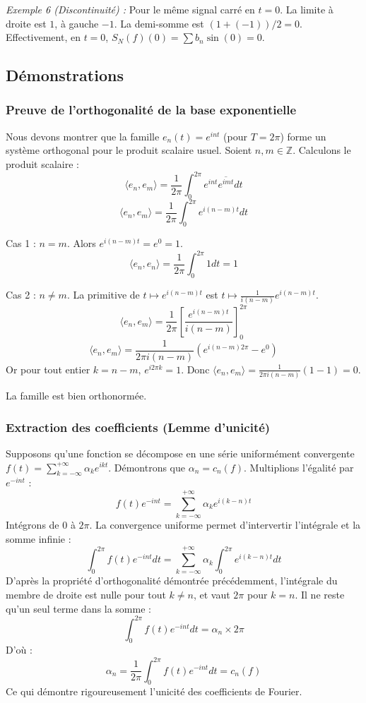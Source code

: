 \documentclass[11pt,a4paper]{article}
\begin{document}
\textit{Exemple 6 (Discontinuité) :}
Pour le même signal carré en $t = 0$. La limite à droite est $1$, à gauche $-1$.
La demi-somme est $(1 + (-1)) / 2 = 0$.
Effectivement, en $t=0$, $S_N(f)(0) = \sum b_n \sin(0) = 0$.

\subsection{Démonstrations}

\subsubsection*{Preuve de l'orthogonalité de la base exponentielle}

Nous devons montrer que la famille $e_n(t) = e^{int}$ (pour $T=2\pi$) forme un système orthogonal pour le produit scalaire usuel.
Soient $n, m \in \mathbb{Z}$. Calculons le produit scalaire :
$$ \langle e_n, e_m \rangle = \frac{1}{2\pi} \int_0^{2\pi} e^{int} \overline{e^{imt}} dt $$
$$ \langle e_n, e_m \rangle = \frac{1}{2\pi} \int_0^{2\pi} e^{i(n-m)t} dt $$

Cas 1 : $n = m$.
Alors $e^{i(n-m)t} = e^0 = 1$.
$$ \langle e_n, e_n \rangle = \frac{1}{2\pi} \int_0^{2\pi} 1 dt = 1 $$

Cas 2 : $n \neq m$.
La primitive de $t \mapsto e^{i(n-m)t}$ est $t \mapsto \frac{1}{i(n-m)} e^{i(n-m)t}$.
$$ \langle e_n, e_m \rangle = \frac{1}{2\pi} \left[ \frac{e^{i(n-m)t}}{i(n-m)} \right]_0^{2\pi} $$
$$ \langle e_n, e_m \rangle = \frac{1}{2\pi i(n-m)} \left( e^{i(n-m)2\pi} - e^0 \right) $$
Or pour tout entier $k = n-m$, $e^{i2\pi k} = 1$.
Donc $\langle e_n, e_m \rangle = \frac{1}{2\pi i(n-m)} (1 - 1) = 0$.

La famille est bien orthonormée.

\subsubsection*{Extraction des coefficients (Lemme d'unicité)}

Supposons qu'une fonction se décompose en une série uniformément convergente $f(t) = \sum_{k=-\infty}^{+\infty} \alpha_k e^{ikt}$. Démontrons que $\alpha_n = c_n(f)$.
Multiplions l'égalité par $e^{-int}$ :
$$ f(t) e^{-int} = \sum_{k=-\infty}^{+\infty} \alpha_k e^{i(k-n)t} $$
Intégrons de $0$ à $2\pi$. La convergence uniforme permet d'intervertir l'intégrale et la somme infinie :
$$ \int_0^{2\pi} f(t) e^{-int} dt = \sum_{k=-\infty}^{+\infty} \alpha_k \int_0^{2\pi} e^{i(k-n)t} dt $$
D'après la propriété d'orthogonalité démontrée précédemment, l'intégrale du membre de droite est nulle pour tout $k \neq n$, et vaut $2\pi$ pour $k=n$.
Il ne reste qu'un seul terme dans la somme :
$$ \int_0^{2\pi} f(t) e^{-int} dt = \alpha_n \times 2\pi $$
D'où :
$$ \alpha_n = \frac{1}{2\pi} \int_0^{2\pi} f(t) e^{-int} dt = c_n(f) $$
Ce qui démontre rigoureusement l'unicité des coefficients de Fourier.
\end{document}
